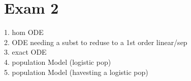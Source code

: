 \documentclass[10pt,a4paper]{article}
\theoremstyle{definition}
\begin{document}
\section*{Exam 2}
  1. hom ODE \\
  2. ODE needing a subst to reduse to a 1st order linear/sep \\
  3. exact ODE \\
  4. population Model (logistic pop) \\
  5. population Model (havesting a logistic pop) \\ 




  
\end{document}
